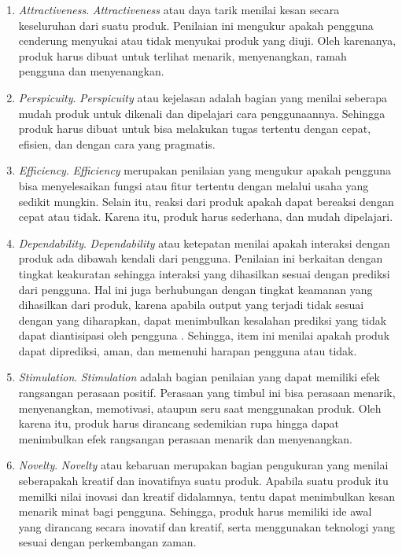 \begin{enumerate}[nolistsep]
  \item\emph{Attractiveness}. \emph{Attractiveness} atau daya tarik menilai kesan secara keseluruhan dari suatu produk. Penilaian ini mengukur apakah pengguna cenderung menyukai atau tidak menyukai produk yang diuji. Oleh karenanya, produk harus dibuat untuk terlihat menarik, menyenangkan, ramah pengguna dan menyenangkan. 
  \item\emph{Perspicuity}. \emph{Perspicuity} atau kejelasan adalah bagian yang menilai seberapa mudah produk untuk dikenali dan dipelajari cara penggunaannya. Sehingga produk harus dibuat untuk bisa melakukan tugas tertentu dengan cepat, efisien, dan dengan cara yang pragmatis.
  \item\emph{Efficiency}. \emph{Efficiency} merupakan penilaian yang mengukur apakah pengguna bisa menyelesaikan fungsi atau fitur tertentu dengan melalui usaha yang sedikit mungkin. Selain itu, reaksi dari produk apakah dapat bereaksi dengan cepat atau tidak. Karena itu, produk harus sederhana, dan mudah dipelajari.
  \item\emph{Dependability}. \emph{Dependability} atau ketepatan menilai apakah interaksi dengan produk ada dibawah kendali dari pengguna. Penilaian ini berkaitan dengan tingkat keakuratan sehingga interaksi yang dihasilkan sesuai dengan prediksi dari pengguna. Hal ini juga berhubungan dengan tingkat keamanan yang dihasilkan dari produk, karena apabila output yang terjadi tidak sesuai dengan yang diharapkan, dapat menimbulkan kesalahan prediksi yang tidak dapat diantisipasi oleh pengguna . Sehingga, item ini menilai apakah produk dapat diprediksi, aman, dan memenuhi harapan pengguna atau tidak.
  \item\emph{Stimulation}. \emph{Stimulation} adalah bagian penilaian yang dapat memiliki efek rangsangan perasaan positif. Perasaan yang timbul ini bisa perasaan menarik, menyenangkan, memotivasi, ataupun seru saat menggunakan produk. Oleh karena itu, produk harus dirancang sedemikian rupa hingga dapat menimbulkan efek rangsangan perasaan menarik dan menyenangkan.
  \item\emph{Novelty}. \emph{Novelty} atau kebaruan merupakan bagian pengukuran yang menilai seberapakah kreatif dan inovatifnya suatu produk. Apabila suatu produk itu memilki nilai inovasi dan kreatif didalamnya, tentu dapat menimbulkan kesan menarik minat bagi pengguna. Sehingga, produk harus memiliki ide awal yang dirancang secara inovatif dan kreatif, serta menggunakan teknologi yang sesuai dengan perkembangan zaman.
\end{enumerate}

